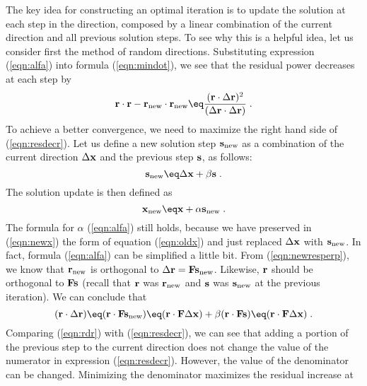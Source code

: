 The key idea for constructing an optimal iteration is to update the
solution at each step in the direction, composed by a linear
combination of the current direction and all previous solution steps.
To see why this is a helpful idea, let us consider first the method of
random directions. Substituting expression (\ref{eqn:alfa}) into
formula (\ref{eqn:mindot}), we see that the residual power
decreases at each step by
\begin{equation}
  \label{eqn:resdecr}
  \bold r \cdot \bold r -
  \bold r_{\rm new} \cdot \bold r_{\rm new} \eq
  \frac{(\bold r \cdot \Delta \bold r )^2}
  {( \Delta \bold r \cdot \Delta \bold r )}\;.
\end{equation}
To achieve a better convergence, we need to maximize the right hand
side of (\ref{eqn:resdecr}). Let us define a new solution step $\bold
s_{\rm new}$ as a combination of the current direction $\Delta \bold
x$ and the previous step $\bold s$, as follows:
\begin{equation}
  \label{eqn:snew}
  \bold s_{\rm new} \eq \Delta \bold x + \beta \bold s\;.
\end{equation}
The solution update is then defined as
\begin{equation}
\bold x_{\rm new} \eq \bold x+\alpha \bold s_{\rm new}\;.
\label{eqn:newx}
\end{equation}
The formula for $\alpha$ (\ref{eqn:alfa}) still holds, because we have
preserved in (\ref{eqn:newx}) the form of equation (\ref{eqn:oldx})
and just replaced $\Delta \bold x$ with $\bold s_{\rm new}$. In fact,
formula (\ref{eqn:alfa}) can be simplified a little bit. From
(\ref{eqn:newresperp}), we know that $\bold r_{\rm new}$ is orthogonal
to $\Delta \bold r = \bold F \bold s_{\rm new}$. Likewise, $\bold r$
should be orthogonal to $\bold F \bold s$ (recall that $\bold r$ was
$\bold r_{\rm new}$ and $\bold s$ was $\bold s_{\rm new}$ at the
previous iteration). We can conclude that
\begin{equation}
  \label{eqn:rdr}
  (\bold r \cdot \Delta \bold r ) \eq 
  (\bold r \cdot \bold F \bold s_{\rm new}) \eq
  (\bold r \cdot \bold F \Delta \bold x) + 
  \beta (\bold r \cdot \bold F \bold s) \eq
  (\bold r \cdot \bold F \Delta \bold x)\;.
\end{equation}
Comparing (\ref{eqn:rdr}) with (\ref{eqn:resdecr}), we can see that
adding a portion of the previous step to the current direction does
not change the value of the numerator in expression
(\ref{eqn:resdecr}). However, the value of the denominator can be
changed. Minimizing the denominator maximizes the residual increase at
